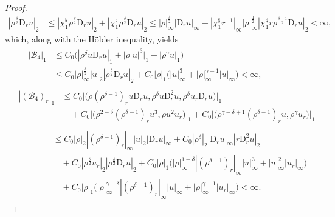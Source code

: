 \documentclass[11pt,reqno]{amsart}
\numberwithin{rk}{section}
\numberwithin{prop}{section}
\numberwithin{mydef}{section}
\numberwithin{lem}{section}
\numberwithin{equation}{section}
\numberwithin{thm}{section}
\begin{document}
\begin{proof}
\begin{equation*}
\begin{aligned}
|\rho^\frac{\delta}{2}\mathrm{D}_r u|_2&\leq  |\chi_1^\flat\rho^\frac{\delta}{2}\mathrm{D}_r u|_2+ |\chi_1^\sharp\rho^\frac{\delta}{2}\mathrm{D}_r u|_2 \leq |\rho|_\infty^\frac{\delta}{2} |\mathrm{D}_r u|_\infty+|\chi_1^\sharp r^{-1}|_\infty|\rho|_\infty^\frac{1}{2} |\chi_1^\sharp r\rho^\frac{\delta-1}{2}\mathrm{D}_r u|_2<\infty,
\end{aligned}
\end{equation*}
which, along with the H\"older inequality, yields
\begin{align*}
&\quad \,\begin{aligned}
|\mathcal{B}_4|_1 &\leq C_0\big( |\rho^\delta u\mathrm{D}_r u|_1+\big|\rho |u|^3\big|_1+|\rho^\gamma u|_1\big)\\
&\leq C_0|\rho|_\infty^\frac{\delta}{2}|u|_2 |\rho^\frac{\delta}{2}\mathrm{D}_r u|_2+C_0|\rho|_1\big(|u|_\infty^3+|\rho|_\infty^{\gamma-1}|u|_\infty\big) <\infty,
\end{aligned}\\[1mm]
&\begin{aligned}
|(\mathcal{B}_4)_r|_1&\leq C_0\big|\big(\rho(\rho^{\delta-1})_ru\mathrm{D}_r u,\rho^\delta u\mathrm{D}_r^2 u,\rho^\delta u_r\mathrm{D}_r u\big)\big|_1\\
&\quad +C_0\big|\big(\rho^{2-\delta}(\rho^{\delta-1})_r u^3,\rho u^2u_r\big)\big|_1 + C_0\big|\big(\rho^{\gamma-\delta+1}(\rho^{\delta-1})_r u,\rho^{\gamma} u_r\big)\big|_1
\end{aligned}\\
&\qquad\quad \ \begin{aligned}
&\leq C_0|\rho|_2|(\rho^{\delta-1})_r|_\infty|u|_2 |\mathrm{D}_r u|_\infty+C_0|\rho^\delta|_2 |\mathrm{D}_r u|_\infty |r\mathrm{D}_r^2 u|_2\\
&\quad +C_0|\rho^\frac{\delta}{2}u_r|_2 |\rho^\frac{\delta}{2}\mathrm{D}_r u|_2+C_0|\rho|_1\big(|\rho|_\infty^{1-\delta}|(\rho^{\delta-1})_r|_\infty|u|_\infty^3+|u|_\infty^2|u_r|_\infty\big)\\
&\quad+C_0|\rho|_1\big(|\rho|_\infty^{\gamma-\delta}|(\rho^{\delta-1})_r|_\infty|u|_\infty+|\rho|_\infty^{\gamma-1}|u_r|_\infty\big)<\infty.
\end{aligned}
\end{align*}




\end{proof}
\end{document}
